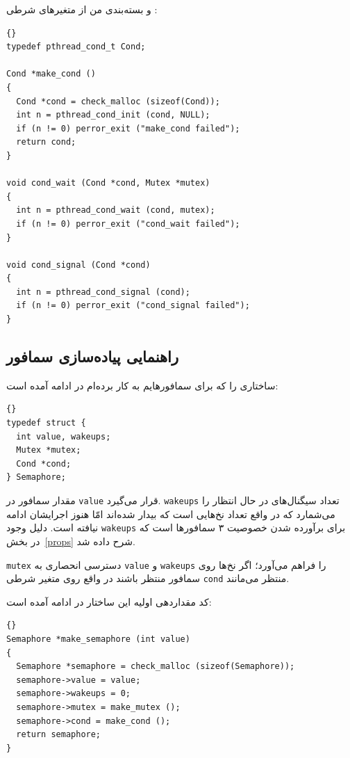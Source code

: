 \documentclass{book}
\newcommand{\clearemptydoublepage}{\newpage\cleardoublepage}
\begin{document}
\newpage
    و بسته‌بندی من از متغیرهای شرطی :


\begin{latin}
\begin{lstlisting}[title={}]{}
typedef pthread_cond_t Cond;

Cond *make_cond ()
{
  Cond *cond = check_malloc (sizeof(Cond)); 
  int n = pthread_cond_init (cond, NULL);
  if (n != 0) perror_exit ("make_cond failed");
  return cond;
}

void cond_wait (Cond *cond, Mutex *mutex)
{
  int n = pthread_cond_wait (cond, mutex);
  if (n != 0) perror_exit ("cond_wait failed");
}

void cond_signal (Cond *cond)
{
  int n = pthread_cond_signal (cond);
  if (n != 0) perror_exit ("cond_signal failed");
}
\end{lstlisting}
\end{latin}



\clearemptydoublepage
\subsection{راهنمایی پیاده‌سازی سمافور}

     ساختاری را که برای سمافورهایم به کار برده‌ام در ادامه آمده است:

\begin{latin}
\begin{lstlisting}[title={}]{}
typedef struct {
  int value, wakeups;
  Mutex *mutex;
  Cond *cond;
} Semaphore;
\end{lstlisting}
\end{latin}

    مقدار سمافور در {\tt value} قرار می‌گیرد.  {\tt wakeups} تعداد سیگنال‌های در حال انتظار را می‌شمارد که در واقع تعداد نخ‌هایی است که 
    بیدار شده‌اند امّا هنوز اجرایشان ادامه نیافته است. دلیل وجود {\tt wakeups} برای برآورده شدن خصوصیت ۳ سمافورها است که در بخش~\ref{props} 
    شرح داده شد. 
    

    {\tt mutex} 
    دسترسی انحصاری به  {\tt value} و {\tt wakeups} را فراهم می‌آورد؛ 
     اگر  نخ‌ها روی سمافور منتظر باشند در واقع روی متغیر شرطی   {\tt cond}  منتظر می‌مانند. 

    کد مقداردهی اولیه این ساختار در ادامه آمده است:

\begin{latin}
\begin{lstlisting}[title={}]{}
Semaphore *make_semaphore (int value)
{
  Semaphore *semaphore = check_malloc (sizeof(Semaphore));
  semaphore->value = value;
  semaphore->wakeups = 0;
  semaphore->mutex = make_mutex ();
  semaphore->cond = make_cond ();
  return semaphore;
}
\end{lstlisting}
\end{latin}
\end{document}
